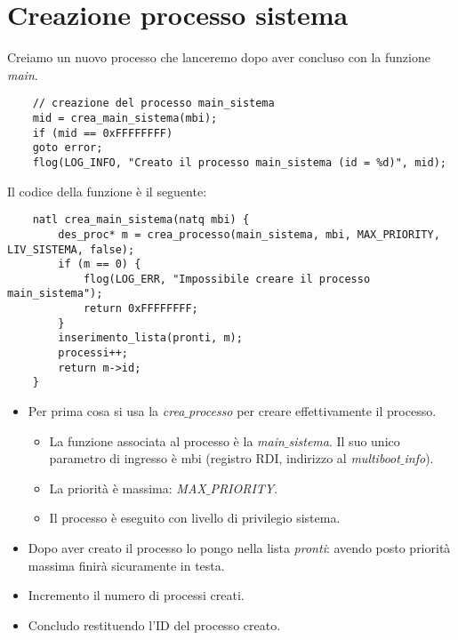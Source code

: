 \section{Creazione processo sistema}
Creiamo un nuovo processo che lanceremo dopo aver concluso con la funzione \emph{main}.
\begin{verbatim}
	// creazione del processo main_sistema
	mid = crea_main_sistema(mbi);
	if (mid == 0xFFFFFFFF)
	goto error;
	flog(LOG_INFO, "Creato il processo main_sistema (id = %d)", mid);
\end{verbatim}
Il codice della funzione è il seguente:
\begin{verbatim}
	natl crea_main_sistema(natq mbi) {
		des_proc* m = crea_processo(main_sistema, mbi, MAX_PRIORITY, LIV_SISTEMA, false);
		if (m == 0) {
			flog(LOG_ERR, "Impossibile creare il processo main_sistema");
			return 0xFFFFFFFF;
		}
		inserimento_lista(pronti, m);
		processi++;
		return m->id;
	}
\end{verbatim}
\begin{itemize}
	\item Per prima cosa si usa la \emph{crea$\_$processo} per creare effettivamente il processo. 
	\begin{itemize}
		\item La funzione associata al processo è la \emph{main$\_$sistema}. Il suo unico parametro di ingresso è {mbi} (registro RDI, indirizzo al \emph{multiboot$\_$info}).
		\item La priorità è massima: \emph{MAX$\_$PRIORITY}.
		\item Il processo è eseguito con livello di privilegio sistema.
	\end{itemize}
	\item Dopo aver creato il processo lo pongo nella lista \emph{pronti}: avendo posto priorità massima finirà sicuramente in testa.
	\item Incremento il numero di processi creati.
	\item Concludo restituendo l'ID del processo creato.
\end{itemize}

